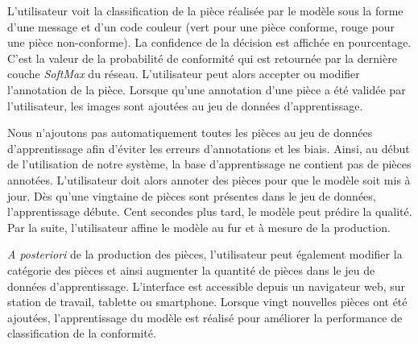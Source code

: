 L'utilisateur voit la classification de la pièce réalisée par le modèle sous la forme d'une message et d'un code couleur (vert pour une pièce conforme, rouge pour une pièce non-conforme).
La confidence de la décision est affichée en pourcentage.
C'est la valeur de la probabilité de conformité qui est retournée par la dernière couche \textit{SoftMax} du réseau.
L'utilisateur peut alors accepter ou modifier l'annotation de la pièce.
Lorsque qu'une annotation d'une pièce a été validée par l'utilisateur, les images sont ajoutées au jeu de données d'apprentissage.

Nous n'ajoutons pas automatiquement toutes les pièces au jeu de données d'apprentissage afin d'éviter les erreurs d'annotations et les biais.
Ainsi, au début de l'utilisation de notre système, la base d'apprentissage ne contient pas de pièces annotées.
L'utilisateur doit alors annoter des pièces pour que le modèle soit mis à jour.
Dès qu'une vingtaine de pièces sont présentes dans le jeu de données, l'apprentissage débute.
Cent secondes plus tard, le modèle peut prédire la qualité.
Par la suite, l'utilisateur affine le modèle au fur et à mesure de la production.

\textit{A posteriori} de la production des pièces, l'utilisateur peut également modifier la catégorie des pièces et ainsi augmenter la quantité de pièces dans le jeu de données d'apprentissage.
L'interface est accessible depuis un navigateur web, sur station de travail, tablette ou smartphone.
Lorsque vingt nouvelles pièces ont été ajoutées, l'apprentissage du modèle est réalisé pour améliorer la performance de classification de la conformité.

